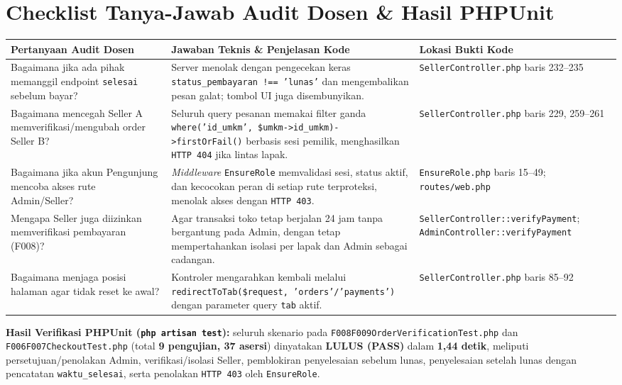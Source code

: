 \documentclass[11pt,a4paper]{article}
\begin{document}
\section{Checklist Tanya-Jawab Audit Dosen \& Hasil PHPUnit}

\renewcommand{\arraystretch}{1.20}
\begin{tabularx}{\textwidth}{|L{4.0cm}|Y|L{3.85cm}|}
\hline
{}
\textbf{Pertanyaan Audit Dosen} & \textbf{Jawaban Teknis \& Penjelasan Kode} & \textbf{Lokasi Bukti Kode} \\
\hline
Bagaimana jika ada pihak memanggil endpoint \texttt{selesai} sebelum bayar? & Server menolak dengan pengecekan keras \texttt{status\_pembayaran !== 'lunas'} dan mengembalikan pesan galat; tombol UI juga disembunyikan. & \texttt{SellerController.php} baris 232--235 \\
\hline
Bagaimana mencegah Seller A memverifikasi/mengubah order Seller B? & Seluruh query pesanan memakai filter ganda \texttt{where('id\_umkm', \$umkm->id\_umkm)->firstOrFail()} berbasis sesi pemilik, menghasilkan \texttt{HTTP 404} jika lintas lapak. & \texttt{SellerController.php} baris 229, 259--261 \\
\hline
Bagaimana jika akun Pengunjung mencoba akses rute Admin/Seller? & \textit{Middleware} \texttt{EnsureRole} memvalidasi sesi, status aktif, dan kecocokan peran di setiap rute terproteksi, menolak akses dengan \texttt{HTTP 403}. & \texttt{EnsureRole.php} baris 15--49; \texttt{routes/web.php} \\
\hline
Mengapa Seller juga diizinkan memverifikasi pembayaran (F008)? & Agar transaksi toko tetap berjalan 24 jam tanpa bergantung pada Admin, dengan tetap mempertahankan isolasi per lapak dan Admin sebagai cadangan. & \texttt{SellerController::\allowbreak verifyPayment}; \texttt{AdminController::\allowbreak verifyPayment} \\
\hline
Bagaimana menjaga posisi halaman agar tidak reset ke awal? & Kontroler mengarahkan kembali melalui \texttt{redirectToTab(\$request, 'orders'/'payments')} dengan parameter query \texttt{tab} aktif. & \texttt{SellerController.php} baris 85--92 \\
\hline
\end{tabularx}

\vspace{0.25cm}
\noindent \textbf{Hasil Verifikasi PHPUnit (\texttt{php artisan test}):} seluruh skenario pada \texttt{F008F009\allowbreak OrderVerificationTest.php} dan \texttt{F006F007\allowbreak CheckoutTest.php} (total \textbf{9 pengujian, 37 asersi}) dinyatakan \textbf{LULUS (PASS)} dalam \textbf{1,44 detik}, meliputi persetujuan/penolakan Admin, verifikasi/isolasi Seller, pemblokiran penyelesaian sebelum lunas, penyelesaian setelah lunas dengan pencatatan \texttt{waktu\_selesai}, serta penolakan \texttt{HTTP 403} oleh \texttt{EnsureRole}.
\end{document}
